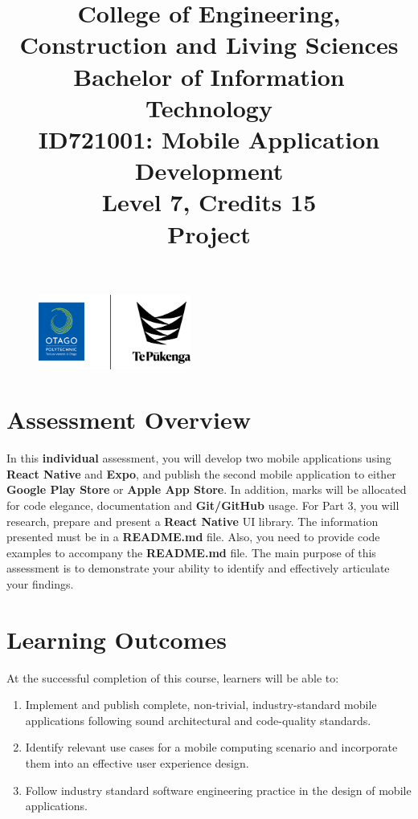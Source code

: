 \documentclass{article}
\author{}
\begin{document}
\begin{figure}
	\centering
	\includegraphics[width=50mm]{"../../../resources (ignore)/img/logo.png"}
\end{figure}
\title{College of Engineering, Construction and Living Sciences\\Bachelor of Information Technology\\ID721001: Mobile Application Development\\Level 7, Credits 15\\\textbf{Project}}
\date{}
\maketitle

\section*{Assessment Overview}
In this \textbf{individual} assessment, you will develop two mobile applications using \textbf{React Native} and \textbf{Expo}, and publish the second mobile application to either \textbf{Google Play Store} or \textbf{Apple App Store}. In addition, marks will be allocated for code elegance, documentation and \textbf{Git/GitHub} usage. For Part 3, you will research, prepare and present a \textbf{React Native} UI library. The information presented must be in a \textbf{README.md} file. Also, you need to provide code examples to accompany the \textbf{README.md} file. The main purpose of this assessment is to demonstrate your ability to identify and effectively articulate your findings.\\

\section*{Learning Outcomes}
At the successful completion of this course, learners will be able to:
\begin{enumerate}
	\item Implement and publish complete, non-trivial, industry-standard mobile applications following sound architectural and code-quality standards.
	\item Identify relevant use cases for a mobile computing scenario and incorporate them into an effective user experience design.
	\item Follow industry standard software engineering practice in the design of mobile applications.
\end{enumerate}
\end{document}
